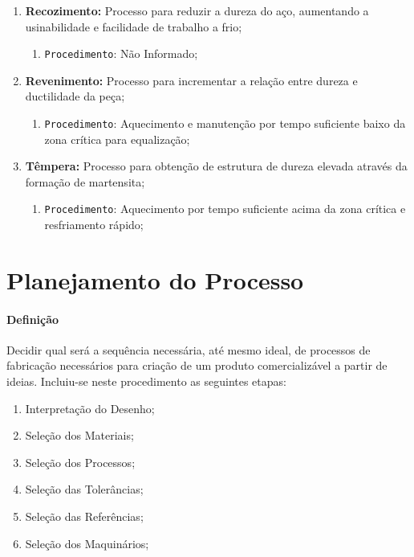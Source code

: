 \documentclass{article}
\begin{document}
\begin{enumerate}[rightmargin = \leftmargin, noitemsep]
                    \item \textbf{Recozimento:} Processo para reduzir a dureza do aço, aumentando a usinabilidade e facilidade de trabalho a frio;
                        \begin{enumerate}[rightmargin = \leftmargin, noitemsep]
                            \item \texttt{Procedimento}: Não Informado;
                        \end{enumerate}

                    \item \textbf{Revenimento:} Processo para incrementar a relação entre dureza e ductilidade da peça;
                        \begin{enumerate}[rightmargin = \leftmargin, noitemsep]
                            \item \texttt{Procedimento}: Aquecimento e manutenção por tempo suficiente baixo da zona crítica para equalização;
                        \end{enumerate}

                    \item \textbf{Têmpera:} Processo para obtenção de estrutura de dureza elevada através da formação de martensita;
                        \begin{enumerate}[rightmargin = \leftmargin, noitemsep]
                            \item \texttt{Procedimento}: Aquecimento por tempo suficiente acima da zona crítica e resfriamento rápido;
                        \end{enumerate}
                \end{enumerate}
\newpage

    \section{Planejamento do Processo}
        \paragraph{Definição}Decidir qual será a sequência necessária, até mesmo ideal, de processos de fabricação necessários para criação de um produto comercializável a partir de ideias. Incluiu-se neste procedimento as seguintes etapas:
            \begin{enumerate}[rightmargin = \leftmargin, noitemsep]
                \item Interpretação do Desenho;
                \item Seleção dos Materiais;
                \item Seleção dos Processos;
                \item Seleção das Tolerâncias;
                \item Seleção das Referências;
                \item Seleção dos Maquinários;
            \end{enumerate}
\newpage
\end{document}
